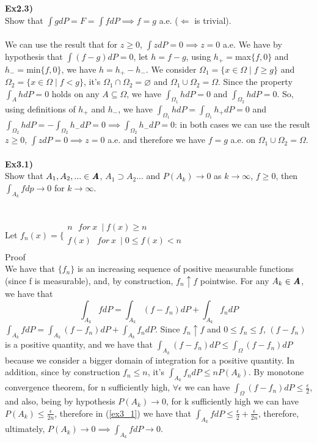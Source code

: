\documentclass[12pt,mythesisstyle]{report}
\begin{document}
\textbf{Ex2.3)}\\
Show that $\int gdP=F=\int fdP\implies f=g$ a.e. ($\Longleftarrow$ is trivial).
\\\\
We can use the result that for $z\geq 0$, $\int zdP=0 \implies z=0$ a.e. We have by hypothesis that $\int (f-g)dP=0$, let $h=f-g$, using $h_+=$max$\{f,0\}$ and $h_-=$min$\{f,0\}$, we have $h=h_+-h_-$. We consider $\Omega_1=\{x\in\Omega \mid f\geq g\}$ and $\Omega_2=\{x\in\Omega \mid f<g\}$, it's $\Omega_1\cap\Omega_2=\varnothing$ and $\Omega_1\cup\Omega_2=\Omega$. Since the property $\int_A hdP=0$ holds on any $A\subseteq\Omega$, we have $\int_{\Omega_1} hdP=0$ and $\int_{\Omega_2} hdP=0$. So, using definitions of $h_+$ and $h_-$, we have $\int_{\Omega_1} hdP=\int_{\Omega_1} h_+dP=0$ and $\int_{\Omega_2} hdP=-\int_{\Omega_2} h_-dP=0\implies\int_{\Omega_2} h_-dP=0$: in both cases we can use the result $z\geq 0$, $\int zdP=0 \implies z=0$ a.e. and therefore we have $f=g$ a.e. on $\Omega_1\cup\Omega_2=\Omega$.
\\\\
\textbf{Ex3.1)}\\
Show that $A_1, A_2,...\in\textbf{\textit{A}}$, $A_1\supset A_2...$ and $P(A_k)\rightarrow 0$ as $k\rightarrow\infty$, $f\geq 0$, then $\int_{A_k}fdp\rightarrow0$ for $k\rightarrow\infty$.
\\\\
\\Let $f_n(x)=\bigg\{
\begin{array}{ll}
n \ \ \ for \ x \ \mid f(x)\geq n\\
f(x) \ \ \ for \  x \ \mid 0\leq f(x)<n\\
\end{array}$
\\
Proof\\
We have that $\{f_n\}$ is an increasing sequence of positive measurable functions (since f is measurable), and, by construction, $f_n \uparrow f$ pointwise. For any $A_k\in\textbf{\textit{A}}$, we have that
\begin{equation} \label{ex3_1}
\int_{A_k}f dP=\int_{A_k}(f-f_n) dP+\int_{A_k}f_n dP
\end{equation}
$\int_{A_k}f dP=\int_{A_k}(f-f_n) dP+\int_{A_k}f_n dP$. Since $f_n \uparrow f$ and $0\leq f_n\leq f$, $(f-f_n)$ is a positive quantity, and we have that $\int_{A_k}(f-f_n) dP\leq\int_{\Omega}(f-f_n)dP$ because we consider a bigger domain of integration for a positive quantity. In addition, since by construction $f_n\leq n$, it's $\int_{A_k}f_n dP\leq nP(A_k)$. By monotone convergence theorem, for n sufficiently high, $\forall \epsilon$ we can have $\int_{\Omega}(f-f_n)dP\leq \frac{\epsilon}{2}$, and also, being by hypothesis $P(A_k)\rightarrow 0$, for k sufficiently high we can have $P(A_k)\leq\frac{\epsilon}{2n}$, therefore in (\ref{ex3_1}) we have that $\int_{A_k}f dP\leq \frac{\epsilon}{2}+\frac{\epsilon}{2n}$, therefore, ultimately, $P(A_k)\rightarrow 0\implies\int_{A_k}f dP\rightarrow 0$.
\end{document}
